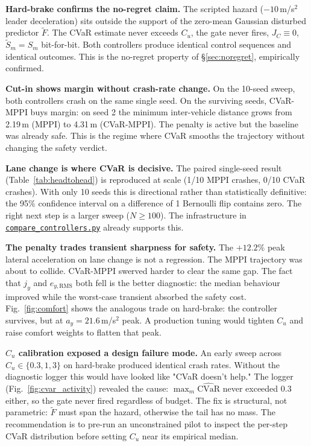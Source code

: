 \documentclass[letterpaper, 10 pt, conference]{ieeeconf}
\newcommand{\repoBase}{https://github.com/USERNAME/mppi-cvar-lane-change-project}
\newcommand{\filelink}[2]{\href{\repoBase/blob/main/#1}{\texttt{#2}}}
\begin{document}
\textbf{Hard-brake confirms the no-regret claim.} The scripted hazard ($-10$\,m/s$^2$ leader deceleration) sits outside the support of the zero-mean Gaussian disturbed predictor $\tilde{F}$. The CVaR estimate never exceeds $C_u$, the gate never fires, $J_C \equiv 0$, $\tilde{S}_m = S_m$ bit-for-bit. Both controllers produce identical control sequences and identical outcomes. This is the no-regret property of \S\ref{sec:noregret}, empirically confirmed.

\textbf{Cut-in shows margin without crash-rate change.} On the 10-seed sweep, both controllers crash on the same single seed. On the surviving seeds, CVaR-MPPI buys margin: on seed 2 the minimum inter-vehicle distance grows from 2.19\,m (MPPI) to 4.31\,m (CVaR-MPPI). The penalty is active but the baseline was already safe. This is the regime where CVaR smooths the trajectory without changing the safety verdict.

\textbf{Lane change is where CVaR is decisive.} The paired single-seed result (Table~\ref{tab:headtohead}) is reproduced at scale (1/10 MPPI crashes, 0/10 CVaR crashes). With only 10 seeds this is directional rather than statistically definitive: the 95\% confidence interval on a difference of 1 Bernoulli flip contains zero. The right next step is a larger sweep ($N \ge 100$). The infrastructure in \filelink{src/experiments/compare_controllers.py}{compare\_controllers.py} already supports this.

\textbf{The penalty trades transient sharpness for safety.} The $+12.2\%$ peak lateral acceleration on lane change is not a regression. The MPPI trajectory was about to collide. CVaR-MPPI swerved harder to clear the same gap. The fact that $j_y$ and $e_{y,\mathrm{RMS}}$ both fell is the better diagnostic: the median behaviour improved while the worst-case transient absorbed the safety cost. Fig.~\ref{fig:comfort} shows the analogous trade on hard-brake: the controller survives, but at $a_y = 21.6$\,m/s$^2$ peak. A production tuning would tighten $C_u$ and raise comfort weights to flatten that peak.

\textbf{$C_u$ calibration exposed a design failure mode.} An early sweep across $C_u \in \{0.3, 1, 3\}$ on hard-brake produced identical crash rates. Without the diagnostic logger this would have looked like "CVaR doesn't help." The logger (Fig.~\ref{fig:cvar_activity}) revealed the cause: $\max_m \widehat{\mathrm{CVaR}}$ never exceeded 0.3 either, so the gate never fired regardless of budget. The fix is structural, not parametric: $\tilde{F}$ must span the hazard, otherwise the tail has no mass. The recommendation is to pre-run an unconstrained pilot to inspect the per-step CVaR distribution before setting $C_u$ near its empirical median.
\end{document}
